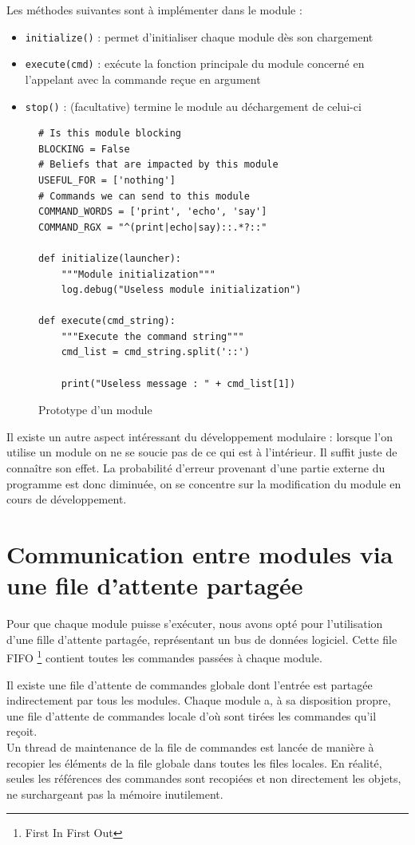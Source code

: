 \documentclass[11pt]{book}
\begin{document}
Les méthodes suivantes sont à implémenter dans le module : 

\begin{itemize}
\item \verb?initialize()? : permet d’initialiser chaque module dès son 
chargement 
\item \verb?execute(cmd)? :  exécute la fonction principale du module 
concerné en l'appelant avec la commande reçue en argument
\item \verb?stop()? : (facultative) termine le module au déchargement de 
celui-ci
\end{itemize}

\begin{figure}
\begin{lstlisting}[style=python]
# Is this module blocking
BLOCKING = False
# Beliefs that are impacted by this module
USEFUL_FOR = ['nothing']
# Commands we can send to this module
COMMAND_WORDS = ['print', 'echo', 'say']
COMMAND_RGX = "^(print|echo|say)::.*?::"

def initialize(launcher):
    """Module initialization"""
    log.debug("Useless module initialization")

def execute(cmd_string):
    """Execute the command string"""
    cmd_list = cmd_string.split('::')
             
    print("Useless message : " + cmd_list[1])

\end{lstlisting}
\caption{Prototype d'un module}
\end{figure}

Il existe un autre aspect intéressant du développement modulaire : lorsque 
l'on utilise un module on ne se soucie pas de ce qui est à l'intérieur. 
Il suffit juste de connaître son effet. La probabilité d'erreur provenant 
d'une partie externe du programme est donc diminuée, on se concentre sur 
la modification du module en cours de développement.

\section{Communication entre modules via une file d'attente partagée}
Pour que chaque module puisse s'exécuter, nous avons opté pour l'utilisation
d'une fille d'attente partagée, représentant un bus de données logiciel. 
Cette file FIFO \footnote{First In First Out} contient toutes les commandes 
passées à chaque module. 

Il existe une file d'attente de commandes globale dont l'entrée est partagée 
indirectement par tous les modules. Chaque module a, à sa disposition propre, 
une file d'attente de commandes locale d'où sont tirées les commandes qu'il
reçoit.\\
Un thread de maintenance de la file de commandes est lancée de manière à 
recopier les éléments de la file globale dans toutes les files locales. En 
réalité, seules les références des commandes sont recopiées et non 
directement les objets, ne surchargeant pas la mémoire inutilement.
\end{document}
